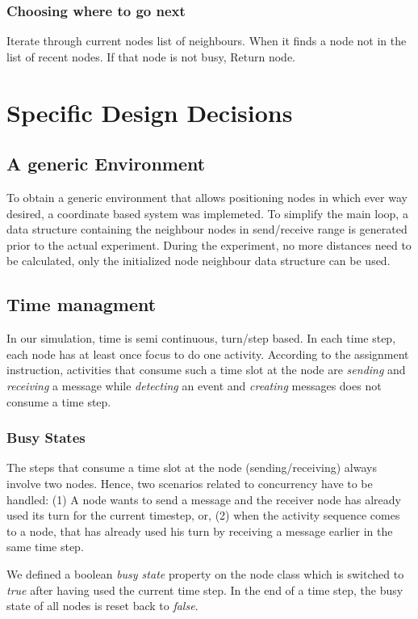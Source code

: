 \documentclass[a4paper,11pt,twoside]{article}
\begin{document}
\subsubsection{Choosing where to go next}
Iterate through current nodes list of neighbours. When it finds a node
not in the list of recent nodes. If that node is not busy, Return node.

\section{Specific Design Decisions}
\subsection{A generic Environment}
To obtain a generic environment that allows positioning nodes in which
ever way desired, a coordinate based system was implemeted. To
simplify the main loop, a data structure containing the
neighbour nodes in send/receive range is generated prior to the actual
experiment. During the experiment, no more distances need to be
calculated, only the initialized node neighbour data structure can be
used.

\subsection{Time managment}
In our simulation, time is semi continuous, turn/step based. 
In each time step, each node has at least once focus to
do one activity. According to the assignment instruction, activities
that consume such a time slot at the node are \textit{sending} and
\textit{receiving} a message while \textit{detecting} an event and
\textit{creating} messages does not consume a time step. 

\subsubsection{Busy States}
The steps that consume a time slot at the node (sending/receiving)
always involve two nodes. Hence, two scenarios related to concurrency
have to be handled: (1) A node wants to send a message and the
receiver node has already used its turn for the current timestep, or,
(2) when the activity sequence comes to a node, that has already used
his turn by receiving a message earlier in the same time step.

We defined a boolean \textit{busy state} property on the node class
which is switched to \textit{true} after having used the current time
step. In the end of a time step, the busy state of all nodes is reset
back to \textit{false}.
\end{document}
